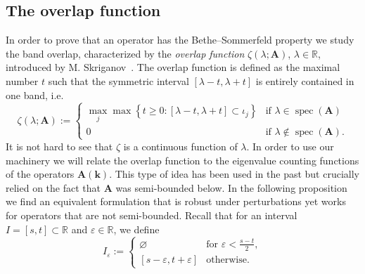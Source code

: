 \documentclass[AHL,Unicode,longabstracts,published]{cedram}
\DeclareMathOperator{\spec}{spec}
\newcommand{\R}{\mathbb R}
\newcommand{\BA}{\mathbf A}
\newcommand{\bk}{\mathbf k}
\newcommand{\eps}{\varepsilon}
\begin{document}
\subsection{The overlap function}
In order to prove that an operator has the Bethe--Sommerfeld property we study the band overlap, characterized by the \emph{overlap function} $\zeta(\lambda;\BA)$, $\lambda \in \R$, introduced by M. Skriganov~\cite{Skriganov}. The overlap function is defined as the maximal number $t$ such that the symmetric interval $[\lambda-t,\lambda+t]$ is entirely contained in one band, i.e.
\begin{equation}\label{eq:defnoverlap}
\zeta(\lambda;\BA) :=
\begin{cases}
\max_j \max\left\{t \ge 0 : [\lambda-t,\lambda+t] \subset \iota_j\right\} & \text{if } \lambda \in
\spec(\BA)\\
0 & \text{if }\lambda \not \in \spec(\BA).
\end{cases}
\end{equation}
It is not hard to see that $\zeta$ is a continuous function of $\lambda$. In order to use our machinery we will relate the overlap function to the eigenvalue counting functions of the operators $\BA(\bk)$. This type of idea has been used in the past but crucially relied on the fact that $\BA$ was semi-bounded below. In the following proposition we find an equivalent formulation that is robust under perturbations yet works for operators that are not semi-bounded. Recall that for an interval $I = [s,t] \subset \R$ and $\eps
\in \R$, we define
\begin{equation}
I_\eps :=
\begin{cases}
\varnothing & \text{for } \eps < \frac{s-t}{2}, \\
[s - \eps,t + \eps] & \text{otherwise.}
\end{cases}
\end{equation}
\end{document}
